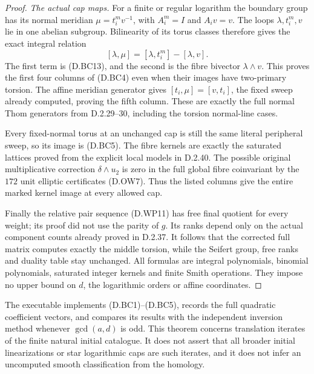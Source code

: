 \begin{proof}
\emph{The actual cap maps.}
For a finite or regular logarithm the boundary
group has its normal meridian
$\mu=t_i^m v^{-1}$, with $A_i^m=I$ and
$A_i v=v$. The loops $\lambda,t_i^m,v$ lie
in one abelian subgroup. Bilinearity of its
torus classes therefore gives the exact
integral relation
\[
              [\lambda,\mu]=[\lambda,t_i^m]-[\lambda,v].
                                                        \tag{D.BC15}
\]
The first term is (D.BC13), and the second is
the fibre bivector $\lambda\wedge v$.
This proves the first four columns of (D.BC4)
even when their images have two-primary
torsion. The affine meridian generator gives
$[t_i,\mu]=[v,t_i]$, the fixed sweep already
computed, proving the fifth column. These
are exactly the full normal Thom generators
from D.2.29--30, including the torsion
normal-line cases.

Every fixed-normal torus at an unchanged cap
is still the same literal peripheral sweep,
so its image is (D.BC5). The fibre kernels
are exactly the saturated lattices proved
from the explicit local models in D.2.40.
The possible original multiplicative
correction $\delta\wedge u_2$ is zero in
the full global fibre coinvariant by the
$172$ unit elliptic certificates (D.OW7).
Thus the listed columns give the entire
marked kernel image at every allowed cap.

Finally the relative pair sequence (D.WP11)
has free final quotient for every weight;
its proof did not use the parity of $g$.
Its ranks depend only on the actual component
counts already proved in D.2.37. It follows
that the corrected full matrix computes
exactly the middle torsion, while the Seifert
group, free ranks and duality table stay
unchanged. All formulas are integral
polynomials, binomial polynomials, saturated
integer kernels and finite Smith operations.
They impose no upper bound on $d$, the
logarithmic orders or affine coordinates.
\end{proof}

The executable
implements (D.BC1)--(D.BC5), records the full
quadratic coefficient vectors, and compares
its results with the independent inversion
method whenever $\gcd(a,d)$ is odd.
This theorem concerns translation iterates
of the finite natural initial catalogue.
It does not assert that all broader initial
linearizations or star logarithmic caps are
such iterates, and it does not infer an
uncomputed smooth classification from the
homology.
